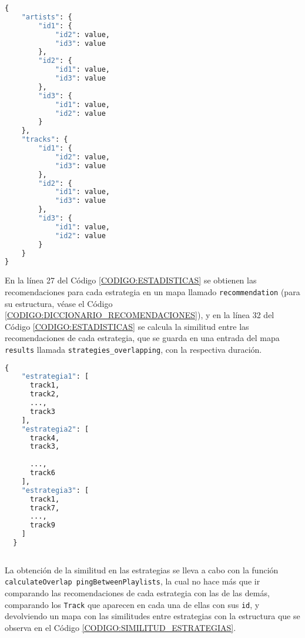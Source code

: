 \begin{lstlisting}[language=python, caption=Diccionario de similitud entre usuarios, label=CODIGO:SIMILITUD_USUARIOS]
  {
    "artists": {
        "id1": {
            "id2": value,
            "id3": value
        },
        "id2": {
            "id1": value,
            "id3": value
        },
        "id3": {
            "id1": value,
            "id2": value
        }
    },
    "tracks": {
        "id1": {
            "id2": value,
            "id3": value
        },
        "id2": {
            "id1": value,
            "id3": value
        },
        "id3": {
            "id1": value,
            "id2": value
        }
    }
}
\end{lstlisting}
En la línea 27 del Código \ref{CODIGO:ESTADISTICAS} se obtienen las recomendaciones para cada estrategia en un mapa 
llamado \texttt{recommendation} (para su estructura, véase el Código \ref{CODIGO:DICCIONARIO_RECOMENDACIONES}), y en la línea 32 del Código \ref{CODIGO:ESTADISTICAS} 
se calcula la similitud entre las recomendaciones de cada estrategia, que se guarda en una entrada del mapa 
\texttt{results} llamada \texttt{strategies\_overlapping}, con la respectiva duración.

\begin{lstlisting}[language=python, caption=Diccionario de recomendaciones, label=CODIGO:DICCIONARIO_RECOMENDACIONES]
  {
    "estrategia1": [
      track1,
      track2,
      ...,
      track3
    ],
    "estrategia2": [
      track4,
      track3,
      
      ...,
      track6
    ],
    "estrategia3": [
      track1,
      track7,
      ...,
      track9
    ]
  }
  
\end{lstlisting}

La obtención de la similitud en las estrategias se lleva a cabo con la función \texttt{calculateOverlap pingBetweenPlaylists}, la cual no hace más que 
ir comparando las recomendaciones de cada estrategia con las de las demás, comparando los \texttt{Track} que aparecen en cada una de ellas con sus \texttt{id}, 
y devolviendo un mapa con las similitudes entre estrategias con la estructura que se observa en el Código \ref{CODIGO:SIMILITUD_ESTRATEGIAS}.

